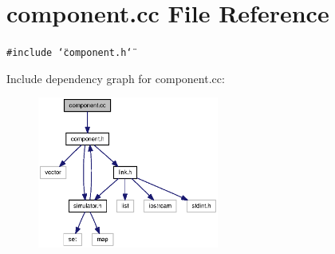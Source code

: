 \section{component.cc File Reference}
\label{component_8cc}
{\tt \#include \char`\"{}component.h\char`\"{}}\par


Include dependency graph for component.cc:\nopagebreak
\begin{figure}[H]
\begin{center}
\leavevmode
\includegraphics[width=169pt]{component_8cc__incl}
\end{center}
\end{figure}
